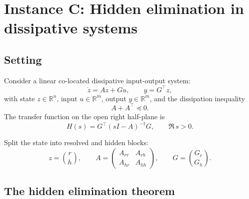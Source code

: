 \documentclass[11pt,a4paper]{article}
\numberwithin{equation}{section}
\newcommand{\R}{\mathbb{R}}
\theoremstyle{thmcompact}
\theoremstyle{remark}
\begin{document}
\section{Instance C: Hidden elimination in dissipative systems}
\label{sec:bridge-C}

\subsection{Setting}

Consider a linear co-located dissipative input-output system:
\begin{equation}\label{eq:C-system}
\dot{z} = Az + Gu, \qquad y = G^\top z,
\end{equation}
with state $z \in \R^n$, input $u \in \R^m$, output $y \in \R^m$, and the dissipation inequality
\begin{equation}\label{eq:C-dissipation}
A + A^\top \preceq 0.
\end{equation}
The transfer function on the open right half-plane is
\begin{equation}\label{eq:C-transfer}
H(s) = G^\top(sI - A)^{-1}G, \qquad \Re\, s > 0.
\end{equation}

Split the state into resolved and hidden blocks:
\begin{equation}\label{eq:C-blocks}
z = \binom{r}{h}, \qquad
A = \begin{pmatrix} A_{rr} & A_{rh} \\ A_{hr} & A_{hh} \end{pmatrix}, \qquad
G = \binom{G_r}{G_h}.
\end{equation}

\subsection{The hidden elimination theorem}
\end{document}
